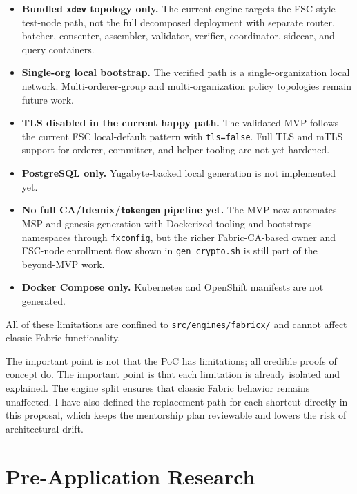 \begin{tcolorbox}[colback=yellow!5!white, colframe=yellow!60!black,
  title=Known PoC Limitations (all isolated inside the new engine architecture),
  fonttitle=\bfseries, arc=4pt]
\begin{itemize}[leftmargin=*]
\item \textbf{Bundled \texttt{xdev} topology only.} The current engine targets the FSC-style test-node path, not the full decomposed deployment with separate router, batcher, consenter, assembler, validator, verifier, coordinator, sidecar, and query containers.
\item \textbf{Single-org local bootstrap.} The verified path is a single-organization local network. Multi-orderer-group and multi-organization policy topologies remain future work.
\item \textbf{TLS disabled in the current happy path.} The validated MVP follows the current FSC local-default pattern with \texttt{tls=false}. Full TLS and mTLS support for orderer, committer, and helper tooling are not yet hardened.
\item \textbf{PostgreSQL only.} Yugabyte-backed local generation is not implemented yet.
\item \textbf{No full CA/Idemix/\texttt{tokengen} pipeline yet.} The MVP now automates MSP and genesis generation with Dockerized tooling and bootstraps namespaces through \texttt{fxconfig}, but the richer Fabric-CA-based owner and FSC-node enrollment flow shown in \texttt{gen\_crypto.sh} is still part of the beyond-MVP work.
\item \textbf{Docker Compose only.} Kubernetes and OpenShift manifests are not generated.
\end{itemize}
All of these limitations are confined to \texttt{src/engines/fabricx/} and cannot affect classic Fabric functionality.
\end{tcolorbox}

The important point is not that the PoC has limitations; all credible proofs of concept do. The important point is that each limitation is already isolated and explained. The engine split ensures that classic Fabric behavior remains unaffected. I have also defined the replacement path for each shortcut directly in this proposal, which keeps the mentorship plan reviewable and lowers the risk of architectural drift.

\section{Pre-Application Research}

